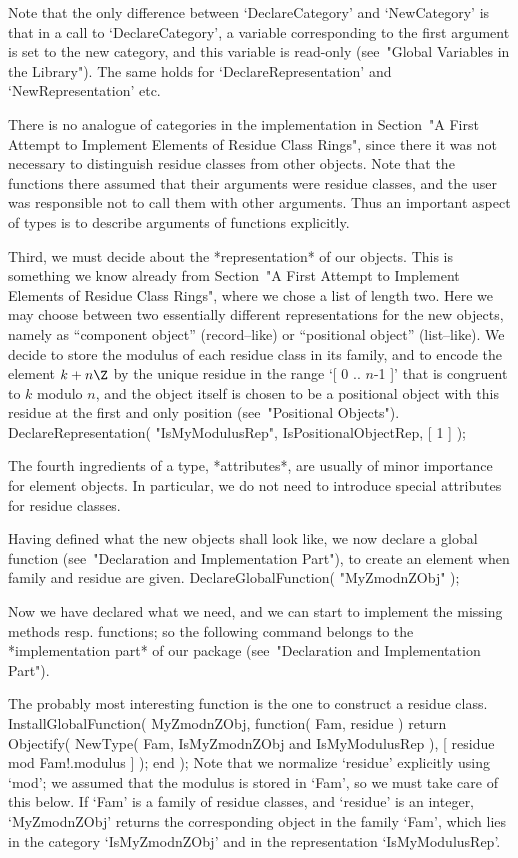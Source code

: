 Note that the only difference between `DeclareCategory' and `NewCategory'
is that in a call to `DeclareCategory', a variable corresponding to the
first argument is set to the new category, and this variable is read-only
(see~"Global Variables in the Library").
The same holds for `DeclareRepresentation' and `NewRepresentation' etc.

There is no analogue of categories in the implementation in
Section~"A First Attempt to Implement Elements of Residue Class Rings",
since there it was not necessary to distinguish residue classes from
other {\GAP} objects.
Note that the functions there assumed that their arguments were residue
classes, and the user was responsible not to call them with other
arguments.
Thus an important aspect of types is to describe arguments of functions
explicitly.

Third, we must decide about the *representation* of our objects.
This is something we know already from
Section~"A First Attempt to Implement Elements of Residue Class Rings",
where we chose a list of length two.
Here we may choose between two essentially different representations for
the new {\GAP} objects, namely as ``component object'' (record--like)
or ``positional object'' (list--like).
We decide to store the modulus of each residue class in its family,
and to encode the element $k + n\Z$ by the unique residue in the range
`[ 0 .. $n$-1 ]' that is congruent to $k$ modulo $n$,
and the object itself is chosen to be a positional object with this
residue at the first and only position (see~"Positional Objects").
\begintt
DeclareRepresentation( "IsMyModulusRep", IsPositionalObjectRep, [ 1 ] );
\endtt

The fourth ingredients of a type, *attributes*, are usually of minor
importance for element objects.
In particular,
we do not need to introduce special attributes for residue classes.

Having defined what the new objects shall look like,
we now declare a global function
(see~"Declaration and Implementation Part"),
to create an element when family and residue are given.
\begintt
DeclareGlobalFunction( "MyZmodnZObj" );
\endtt

Now we have declared what we need,
and we can start to implement the missing methods resp. functions;
so the following command belongs to the *implementation part* of our
package (see~"Declaration and Implementation Part").

The probably most interesting function is the one to construct a
residue class.
\begintt
InstallGlobalFunction( MyZmodnZObj, function( Fam, residue )
    return Objectify( NewType( Fam, IsMyZmodnZObj and IsMyModulusRep ),
                      [ residue mod Fam!.modulus ] );
end );
\endtt
Note that we normalize `residue' explicitly using `mod';
we assumed that the modulus is stored in `Fam',
so we must take care of this below.
If `Fam' is a family of residue classes, and `residue' is an integer,
`MyZmodnZObj' returns the corresponding object in the family `Fam',
which lies in the category `IsMyZmodnZObj' and in the representation
`IsMyModulusRep'.

